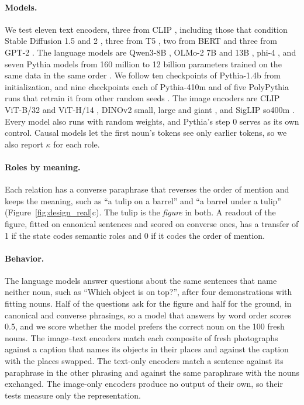 \documentclass[10pt]{article}
\theoremstyle{plain}
\theoremstyle{remark}
\begin{document}
\paragraph{Models.} We test eleven text encoders, three from CLIP \citep{radford2021clip}, including those that condition Stable Diffusion 1.5 and 2 \citep{rombach2022}, three from T5 \citep{raffel2020t5}, two from BERT \citep{devlin2019bert} and three from GPT-2 \citep{radford2019gpt2}. The language models are Qwen3-8B \citep{yang2025qwen3}, OLMo-2 7B and 13B \citep{olmo2024olmo2}, phi-4 \citep{abdin2024phi4}, and seven Pythia models from 160 million to 12 billion parameters trained on the same data in the same order \citep{biderman2023pythia}. We follow ten checkpoints of Pythia-1.4b from initialization, and nine checkpoints each of Pythia-410m and of five PolyPythia runs that retrain it from other random seeds \citep{vanderwal2025polypythias}. The image encoders are CLIP ViT-B/32 and ViT-H/14 \citep{radford2021clip,cherti2023}, DINOv2 small, large and giant \citep{oquab2024dinov2}, and SigLIP so400m \citep{zhai2023siglip}. Every model also runs with random weights, and Pythia's step 0 serves as its own control. Causal models let the first noun's tokens see only earlier tokens, so we also report $\kappa$ for each role.

\paragraph{Roles by meaning.} Each relation has a converse paraphrase that reverses the order of mention and keeps the meaning, such as ``a tulip on a barrel'' and ``a barrel under a tulip'' (Figure~\ref{fig:design_real}c). The tulip is the \emph{figure} in both. A readout of the figure, fitted on canonical sentences and scored on converse ones, has a transfer of 1 if the state codes semantic roles and 0 if it codes the order of mention.

\paragraph{Behavior.} The language models answer questions about the same sentences that name neither noun, such as ``Which object is on top?'', after four demonstrations with fitting nouns. Half of the questions ask for the figure and half for the ground, in canonical and converse phrasings, so a model that answers by word order scores 0.5, and we score whether the model prefers the correct noun on the 100 fresh nouns. The image--text encoders match each composite of fresh photographs against a caption that names its objects in their places and against the caption with the places swapped. The text-only encoders match a sentence against its paraphrase in the other phrasing and against the same paraphrase with the nouns exchanged. The image-only encoders produce no output of their own, so their tests measure only the representation.
\end{document}
